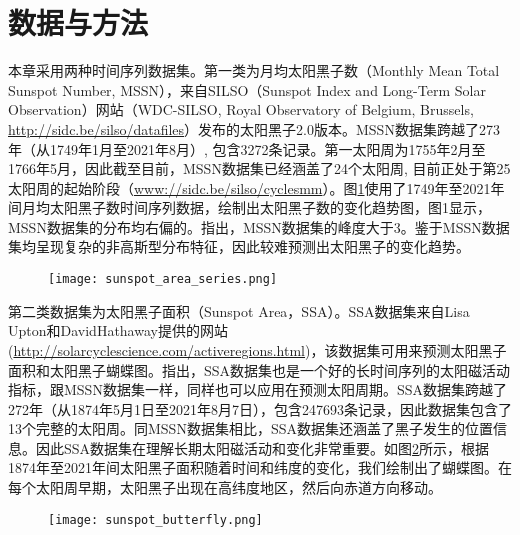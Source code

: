 \section{数据与方法}\label{sec:ss_result}

本章采用两种时间序列数据集。第一类为月均太阳黑子数（Monthly Mean Total Sunspot Number, MSSN），来自SILSO（Sunspot Index and Long-Term Solar Observation）网站（WDC-SILSO, Royal Observatory of Belgium, Brussels, \href{http://sidc.be/silso/datafiles}{http://sidc.be/silso/datafiles}）发布的太阳黑子2.0版本。MSSN数据集跨越了273年（从1749年1月至2021年8月）, 包含3272条记录。第一太阳周为1755年2月至1766年5月，因此截至目前，MSSN数据集已经涵盖了24个太阳周, 目前正处于第25太阳周的起始阶段（\href{www://sidc.be/silso/cyclesmm}{www://sidc.be/silso/cyclesmm}）。图\ref{fig:sunspot_area_series}使用了1749年至2021年间月均太阳黑子数时间序列数据，绘制出太阳黑子数的变化趋势图，图1显示，MSSN数据集的分布均右偏的。\citet{panigrahi2021forecasting}指出，MSSN数据集的峰度大于3。鉴于MSSN数据集均呈现复杂的非高斯型分布特征，因此较难预测出太阳黑子的变化趋势。

\begin{figure}[!htbp]
  \centering
  \texttt{[image: sunspot\_area\_series.png]}
  \vspace{-1cm}
  \label{fig:sunspot_area_series}
\end{figure}

第二类数据集为太阳黑子面积（Sunspot Area，SSA）。SSA数据集来自Lisa Upton和DavidHathaway提供的网站(\href{http://solarcyclescience.com/activeregions.html}{http://solarcyclescience.com/activeregions.html})，该数据集可用来预测太阳黑子面积和太阳黑子蝴蝶图。\citet{hathaway2015solar}指出，SSA数据集也是一个好的长时间序列的太阳磁活动指标，跟MSSN数据集一样，同样也可以应用在预测太阳周期。SSA数据集跨越了272年（从1874年5月1日至2021年8月7日），包含247693条记录，因此数据集包含了13个完整的太阳周。同MSSN数据集相比，SSA数据集还涵盖了黑子发生的位置信息。因此SSA数据集在理解长期太阳磁活动和变化非常重要。如图\ref{fig:sunspot_butterfly}所示，根据1874年至2021年间太阳黑子面积随着时间和纬度的变化，我们绘制出了蝴蝶图。在每个太阳周早期，太阳黑子出现在高纬度地区，然后向赤道方向移动。

\begin{figure}[!htbp]
  \centering
  \texttt{[image: sunspot\_butterfly.png]}
  \vspace{-1cm}
  \label{fig:sunspot_butterfly}
\end{figure}

